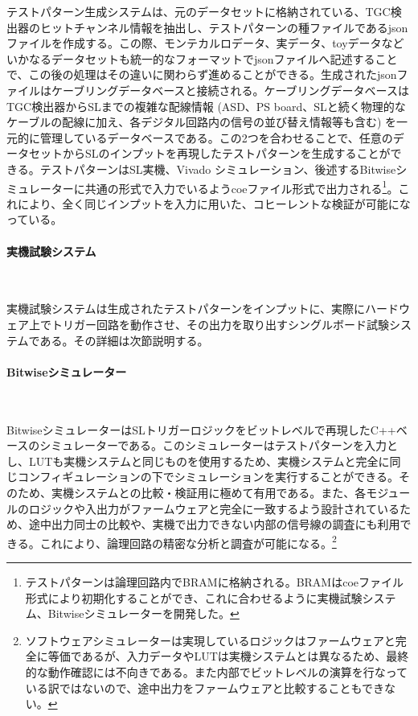 テストパターン生成システムは、元のデータセットに格納されている、TGC検出器のヒットチャンネル情報を抽出し、テストパターンの種ファイルであるjsonファイルを作成する。この際、モンテカルロデータ、実データ、toyデータなどいかなるデータセットも統一的なフォーマットでjsonファイルへ記述することで、この後の処理はその違いに関わらず進めることができる。生成されたjsonファイルはケーブリングデータベースと接続される。ケーブリングデータベースはTGC検出器からSLまでの複雑な配線情報 (ASD、PS board、SLと続く物理的なケーブルの配線に加え、各デジタル回路内の信号の並び替え情報等も含む) を一元的に管理しているデータベースである。この2つを合わせることで、任意のデータセットからSLのインプットを再現したテストパターンを生成することができる。テストパターンはSL実機、Vivado シミュレーション、後述するBitwiseシミュレーターに共通の形式で入力でいるようcoeファイル形式で出力される\footnote{テストパターンは論理回路内でBRAMに格納される。BRAMはcoeファイル形式により初期化することができ、これに合わせるように実機試験システム、Bitwiseシミュレーターを開発した。}。これにより、全く同じインプットを入力に用いた、コヒーレントな検証が可能になっている。

\paragraph{実機試験システム}　　
\par
実機試験システムは生成されたテストパターンをインプットに、実際にハードウェア上でトリガー回路を動作させ、その出力を取り出すシングルボード試験システムである。その詳細は次節説明する。

\paragraph{Bitwiseシミュレーター}　　
\par
BitwiseシミュレーターはSLトリガーロジックをビットレベルで再現したC++ベースのシミュレーターである。このシミュレーターはテストパターンを入力とし、LUTも実機システムと同じものを使用するため、実機システムと完全に同じコンフィギュレーションの下でシミュレーションを実行することができる。そのため、実機システムとの比較・検証用に極めて有用である。また、各モジュールのロジックや入出力がファームウェアと完全に一致するよう設計されているため、途中出力同士の比較や、実機で出力できない内部の信号線の調査にも利用できる。これにより、論理回路の精密な分析と調査が可能になる。\footnote{ソフトウェアシミュレーターは実現しているロジックはファームウェアと完全に等価であるが、入力データやLUTは実機システムとは異なるため、最終的な動作確認には不向きである。また内部でビットレベルの演算を行なっている訳ではないので、途中出力をファームウェアと比較することもできない。}


